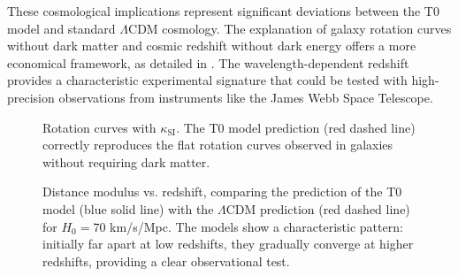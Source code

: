 \documentclass[12pt,a4paper]{article}
\begin{document}
	These cosmological implications represent significant deviations between the T0 model and standard \(\Lambda\)CDM cosmology. The explanation of galaxy rotation curves without dark matter and cosmic redshift without dark energy offers a more economical framework, as detailed in \cite{pascher_messdifferenzen_2025}. The wavelength-dependent redshift provides a characteristic experimental signature that could be tested with high-precision observations from instruments like the James Webb Space Telescope.
	
	\begin{figure}[h]
		\centering
		\caption{Rotation curves with \(\kappa_{\text{SI}}\). The T0 model prediction (red dashed line) correctly reproduces the flat rotation curves observed in galaxies without requiring dark matter.}
		\label{fig:rotation_curves}
	\end{figure}
	
	\begin{figure}[ht]
		\centering
		\caption{Distance modulus vs. redshift, comparing the prediction of the T0 model (blue solid line) with the \(\Lambda\)CDM prediction (red dashed line) for \(H_0 = 70\) km/s/Mpc. The models show a characteristic pattern: initially far apart at low redshifts, they gradually converge at higher redshifts, providing a clear observational test.}
		\label{fig:distance_modulus}
	\end{figure}
	
\end{document}
